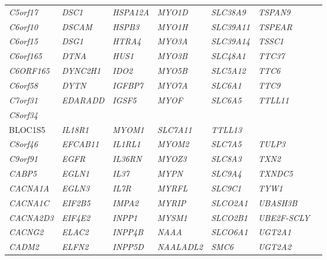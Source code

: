 \begin{refsection}
\begin{otherlanguage}{english}
\begin{scriptsize}
\begin{longtable}{lllllll}
\textit{C5orf17} & \textit{DSC1} & \textit{HSPA12A} & \textit{MYO1D} & \textit{SLC38A9} & \textit{TSPAN9} & \textit{} \\
\textit{C6orf10} & \textit{DSCAM} & \textit{HSPB3} & \textit{MYO1H} & \textit{SLC39A11} & \textit{TSPEAR} & \textit{} \\
\textit{C6orf15} & \textit{DSG1} & \textit{HTRA4} & \textit{MYO3A} & \textit{SLC39A14} & \textit{TSSC1} & \textit{} \\
\textit{C6orf165} & \textit{DTNA} & \textit{HUS1} & \textit{MYO3B} & \textit{SLC48A1} & \textit{TTC37} & \textit{} \\
\textit{C6ORF165} & \textit{DYNC2H1} & \textit{IDO2} & \textit{MYO5B} & \textit{SLC5A12} & \textit{TTC6} & \textit{} \\
\textit{C6orf58} & \textit{DYTN} & \textit{IGFBP7} & \textit{MYO7A} & \textit{SLC6A1} & \textit{TTC9} & \textit{} \\
\textit{C7orf31} & \textit{EDARADD} & \textit{IGSF5} & \textit{MYOF} & \textit{SLC6A5} & \textit{TTLL11} & \textit{} \\
\textit{C8orf34} & \textit{\begin{tabular}[c]{@{}l@{}}EEF1E1-\\ BLOC1S5\end{tabular}} & \textit{IL18R1} & \textit{MYOM1} & \textit{SLC7A11} & \textit{TTLL13} & \textit{} \\
\textit{C8orf46} & \textit{EFCAB11} & \textit{IL1RL1} & \textit{MYOM2} & \textit{SLC7A5} & \textit{TULP3} & \textit{} \\
\textit{C9orf91} & \textit{EGFR} & \textit{IL36RN} & \textit{MYOZ3} & \textit{SLC8A3} & \textit{TXN2} & \textit{} \\
\textit{CABP5} & \textit{EGLN1} & \textit{IL37} & \textit{MYPN} & \textit{SLC9A4} & \textit{TXNDC5} & \textit{} \\
\textit{CACNA1A} & \textit{EGLN3} & \textit{IL7R} & \textit{MYRFL} & \textit{SLC9C1} & \textit{TYW1} & \textit{} \\
\textit{CACNA1C} & \textit{EIF2B5} & \textit{IMPA2} & \textit{MYRIP} & \textit{SLCO2A1} & \textit{UBASH3B} & \textit{} \\
\textit{CACNA2D3} & \textit{EIF4E2} & \textit{INPP1} & \textit{MYSM1} & \textit{SLCO2B1} & \textit{UBE2F-SCLY} & \textit{} \\
\textit{CACNG2} & \textit{ELAC2} & \textit{INPP4B} & \textit{NAAA} & \textit{SLCO6A1} & \textit{UGT2A1} & \textit{} \\
\textit{CADM2} & \textit{ELFN2} & \textit{INPP5D} & \textit{NAALADL2} & \textit{SMC6} & \textit{UGT2A2} & \textit{} \\

\end{longtable}
\end{scriptsize}
\end{otherlanguage}
\end{refsection}
